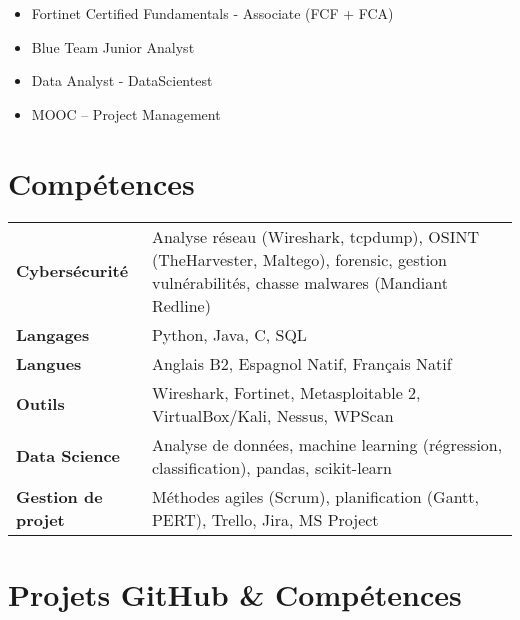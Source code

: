 \documentclass[a4paper,10pt]{article}
\begin{document}
\begin{itemize}[leftmargin=*]
    \item Fortinet Certified Fundamentals -  Associate (FCF + FCA) 
    \item Blue Team Junior Analyst
    \item Data Analyst - DataScientest 
    \item MOOC – Project Management
\end{itemize}

\section*{Compétences}

\begin{tabular}{p{4cm} p{15cm}}
\textbf{Cybersécurité} & Analyse réseau (Wireshark, tcpdump), OSINT (TheHarvester, Maltego), forensic, gestion vulnérabilités, chasse malwares (Mandiant Redline) \\
\textbf{Langages} & Python, Java, C, SQL \\
\textbf{Langues} & Anglais B2, Espagnol Natif, Français Natif \\
\textbf{Outils} & Wireshark, Fortinet, Metasploitable 2, VirtualBox/Kali, Nessus, WPScan \\
\textbf{Data Science} & Analyse de données, machine learning (régression, classification), pandas, scikit-learn \\
\textbf{Gestion de projet} & Méthodes agiles (Scrum), planification (Gantt, PERT), Trello, Jira, MS Project 
\end{tabular}



\section*{ Projets GitHub \& Compétences }
\end{document}
